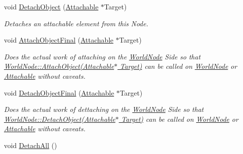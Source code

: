 \begin{DoxyCompactItemize}
void \hyperlink{classphys_1_1WorldNode_a15da2580dfbe1c684819d8783b3359ae}{DetachObject} (\hyperlink{classphys_1_1Attachable}{Attachable} $\ast$Target)
\begin{DoxyCompactList}\small\item\em Detaches an attachable element from this Node. \item\end{DoxyCompactList}\item 
void \hyperlink{classphys_1_1WorldNode_a6e4aa8bc4b916cfff06d03814a7dd80f}{AttachObjectFinal} (\hyperlink{classphys_1_1Attachable}{Attachable} $\ast$Target)
\begin{DoxyCompactList}\small\item\em Does the actual work of attaching on the \hyperlink{classphys_1_1WorldNode}{WorldNode} Side so that \hyperlink{classphys_1_1WorldNode_a25b5a05bb87967fe21f153ce4418b43e}{WorldNode::AttachObject(Attachable$\ast$ Target)} can be called on \hyperlink{classphys_1_1WorldNode}{WorldNode} or \hyperlink{classphys_1_1Attachable}{Attachable} without caveats. \item\end{DoxyCompactList}\item 
void \hyperlink{classphys_1_1WorldNode_ae300db6515b782b165e77d19b7137851}{DetachObjectFinal} (\hyperlink{classphys_1_1Attachable}{Attachable} $\ast$Target)
\begin{DoxyCompactList}\small\item\em Does the actual work of dettaching on the \hyperlink{classphys_1_1WorldNode}{WorldNode} Side so that \hyperlink{classphys_1_1WorldNode_a15da2580dfbe1c684819d8783b3359ae}{WorldNode::DetachObject(Attachable$\ast$ Target)} can be called on \hyperlink{classphys_1_1WorldNode}{WorldNode} or \hyperlink{classphys_1_1Attachable}{Attachable} without caveats. \item\end{DoxyCompactList}\item 
\hypertarget{classphys_1_1WorldNode_ab13dcee1719c95f8328eba2e2d7a94da}{
void \hyperlink{classphys_1_1WorldNode_ab13dcee1719c95f8328eba2e2d7a94da}{DetachAll} ()}
\label{classphys_1_1WorldNode_ab13dcee1719c95f8328eba2e2d7a94da}


\end{DoxyCompactItemize}
